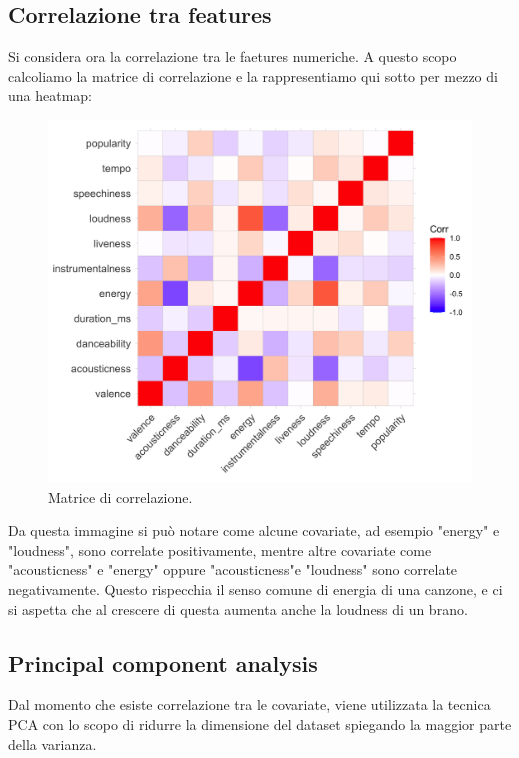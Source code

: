 \subsection{Correlazione tra features}
\label{sec:correlazione}
Si considera ora la correlazione tra le faetures numeriche. A questo
scopo calcoliamo la matrice di correlazione e la rappresentiamo qui
sotto per mezzo di una heatmap:

\begin{figure}[H]
	\centering
	\includegraphics[width=14cm]{../images/correlation.png}
	\caption{Matrice di correlazione.}
\end{figure}

Da questa immagine si può notare come alcune covariate, ad esempio
"energy" e "loudness", sono correlate positivamente, mentre altre
covariate come "acousticness" e "energy" oppure "acousticness"e
"loudness" sono correlate negativamente. Questo rispecchia il senso
comune di energia di una canzone, e ci si aspetta che al crescere di
questa aumenta anche la loudness di un brano.

\subsection{Principal component analysis}
\label{sec:pca}
Dal momento che esiste correlazione tra le covariate, viene utilizzata
la tecnica PCA con lo scopo di ridurre la dimensione del dataset
spiegando la maggior parte della varianza.

